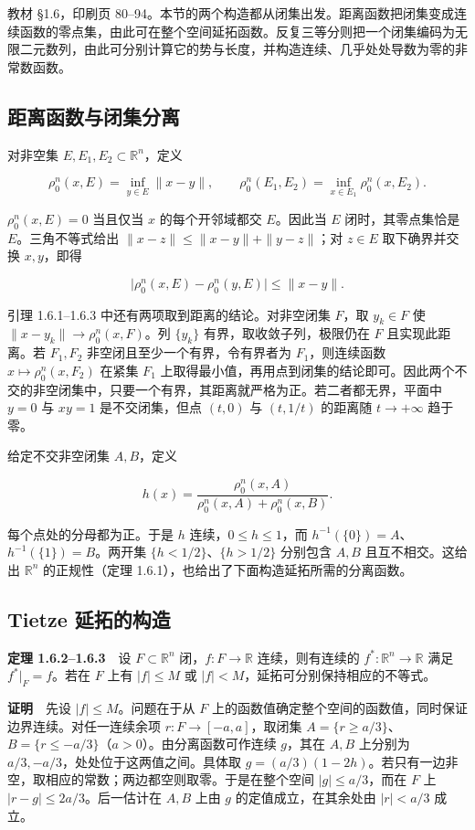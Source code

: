 \documentclass[11pt,a4paper]{article}
\begin{document}
教材 §1.6，印刷页 80--94。本节的两个构造都从闭集出发。距离函数把闭集变成连续函数的零点集，由此可在整个空间延拓函数。反复三等分则把一个闭集编码为无限二元数列，由此可分别计算它的势与长度，并构造连续、几乎处处导数为零的非常数函数。

\subsection{距离函数与闭集分离}

对非空集 \(E,E_1,E_2\subset\mathbb R^n\)，定义

\[
\rho_0^n(x,E)=\inf_{y\in E}\|x-y\|,\qquad
\rho_0^n(E_1,E_2)=\inf_{x\in E_1}\rho_0^n(x,E_2).
\]

\(\rho_0^n(x,E)=0\) 当且仅当 \(x\) 的每个开邻域都交 \(E\)。因此当 \(E\) 闭时，其零点集恰是 \(E\)。三角不等式给出 \(\|x-z\|\leq\|x-y\|+\|y-z\|\)；对 \(z\in E\) 取下确界并交换 \(x,y\)，即得

\[
\big|\rho_0^n(x,E)-\rho_0^n(y,E)\big|\leq\|x-y\|.
\]

引理 1.6.1--1.6.3 中还有两项取到距离的结论。对非空闭集 \(F\)，取 \(y_k\in F\) 使 \(\|x-y_k\|\to\rho_0^n(x,F)\)。列 \(\{y_k\}\) 有界，取收敛子列，极限仍在 \(F\) 且实现此距离。若 \(F_1,F_2\) 非空闭且至少一个有界，令有界者为 \(F_1\)，则连续函数 \(x\mapsto\rho_0^n(x,F_2)\) 在紧集 \(F_1\) 上取得最小值，再用点到闭集的结论即可。因此两个不交的非空闭集中，只要一个有界，其距离就严格为正。若二者都无界，平面中 \(y=0\) 与 \(xy=1\) 是不交闭集，但点 \((t,0)\) 与 \((t,1/t)\) 的距离随 \(t\to+\infty\) 趋于零。

给定不交非空闭集 \(A,B\)，定义

\[
h(x)=\frac{\rho_0^n(x,A)}{\rho_0^n(x,A)+\rho_0^n(x,B)}.
\]

每个点处的分母都为正。于是 \(h\) 连续，\(0\leq h\leq1\)，而 \(h^{-1}(\{0\})=A\)、\(h^{-1}(\{1\})=B\)。两开集 \(\{h<1/2\}\)、\(\{h>1/2\}\) 分别包含 \(A,B\) 且互不相交。这给出 \(\mathbb R^n\) 的正规性（定理 1.6.1），也给出了下面构造延拓所需的分离函数。

\subsection{Tietze 延拓的构造}

\textbf{定理 1.6.2--1.6.3}　设 \(F\subset\mathbb R^n\) 闭，\(f:F\to\mathbb R\) 连续，则有连续的 \(f^*:\mathbb R^n\to\mathbb R\) 满足 \(f^*|_F=f\)。若在 \(F\) 上有 \(|f|\leq M\) 或 \(|f|<M\)，延拓可分别保持相应的不等式。

\textbf{证明}　先设 \(|f|\leq M\)。问题在于从 \(F\) 上的函数值确定整个空间的函数值，同时保证边界连续。对任一连续余项 \(r:F\to[-a,a]\)，取闭集 \(A=\{r\geq a/3\}\)、\(B=\{r\leq-a/3\}\)（\(a>0\)）。由分离函数可作连续 \(g\)，其在 \(A,B\) 上分别为 \(a/3,-a/3\)，处处位于这两值之间。具体取 \(g=(a/3)(1-2h)\)。若只有一边非空，取相应的常数；两边都空则取零。于是在整个空间 \(|g|\leq a/3\)，而在 \(F\) 上 \(|r-g|\leq2a/3\)。后一估计在 \(A,B\) 上由 \(g\) 的定值成立，在其余处由 \(|r|<a/3\) 成立。
\end{document}
